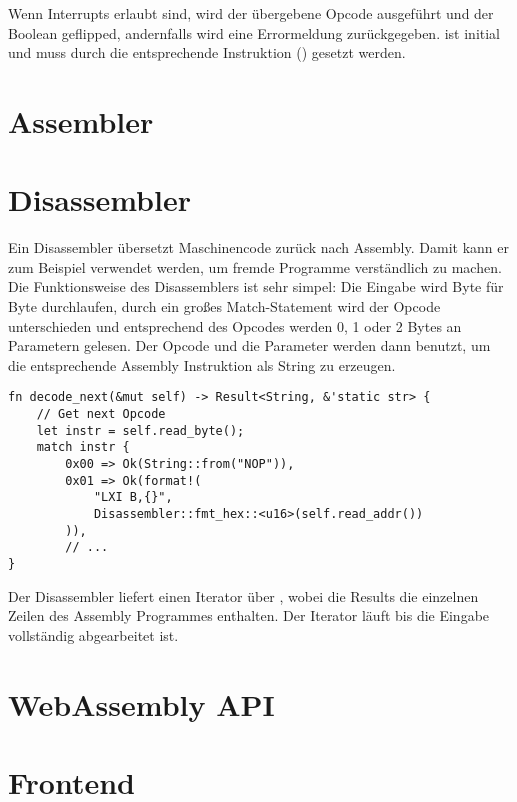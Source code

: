 Wenn Interrupts erlaubt sind, wird der übergebene Opcode ausgeführt und der Boolean geflipped, andernfalls wird eine Errormeldung zurückgegeben.  ist initial  und muss durch die entsprechende Instruktion () gesetzt werden.

\section{Assembler}

\section{Disassembler}

Ein Disassembler übersetzt Maschinencode zurück nach Assembly. Damit kann er zum Beispiel verwendet werden, um fremde Programme verständlich zu machen.
Die Funktionsweise des Disassemblers ist sehr simpel: Die Eingabe wird Byte für Byte durchlaufen, durch ein großes Match-Statement wird der Opcode unterschieden und entsprechend des Opcodes werden 0, 1 oder 2 Bytes an Parametern gelesen. Der Opcode und die Parameter werden dann benutzt, um die entsprechende Assembly Instruktion als String zu erzeugen.

\begin{verbatim}
fn decode_next(&mut self) -> Result<String, &'static str> {
    // Get next Opcode
    let instr = self.read_byte();
    match instr {
        0x00 => Ok(String::from("NOP")),
        0x01 => Ok(format!(
            "LXI B,{}",
            Disassembler::fmt_hex::<u16>(self.read_addr())
        )),
        // ...
}
\end{verbatim}

Der Disassembler liefert einen Iterator über , wobei die Results die einzelnen Zeilen des Assembly Programmes enthalten. Der Iterator läuft bis die Eingabe vollständig abgearbeitet ist.

\section{WebAssembly API}

\section{Frontend}
